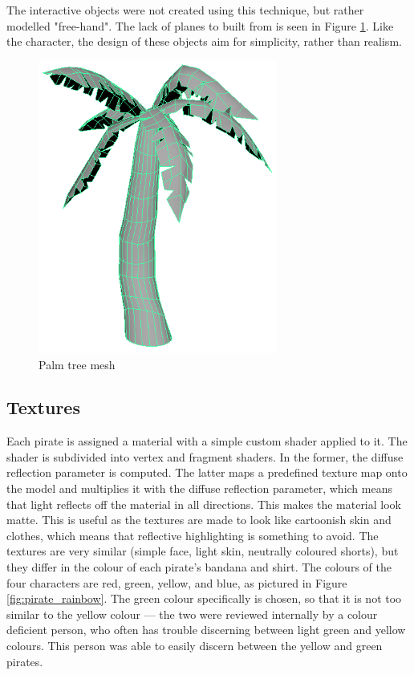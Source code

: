 The interactive objects were not created using this technique, but rather modelled "free-hand". The lack of planes to built from is seen in Figure \ref{fig:palmtree_mesh}. Like the character, the design of these objects aim for simplicity, rather than realism.

\begin{figure}[h!]
	\centering
	\includegraphics[width=0.7\textwidth]{figures/palmtree_mesh.png}
	\caption{Palm tree mesh \label{fig:palmtree_mesh}}
\end{figure}

\subsection{Textures}
Each pirate is assigned a material with a simple custom shader applied to it. The shader is subdivided into vertex and fragment shaders. In the former, the diffuse reflection parameter is computed. The latter maps a predefined texture map onto the model and multiplies it with the diffuse reflection parameter, which means that light reflects off the material in all directions. This makes the material look matte. This is useful as the textures are made to look like cartoonish skin and clothes, which means that reflective highlighting is something to avoid. The textures are very similar (simple face, light skin, neutrally coloured shorts), but they differ in the colour of each pirate's bandana and shirt. The colours of the four characters are red, green, yellow, and blue, as pictured in Figure \ref{fig:pirate_rainbow}. The green colour specifically is chosen, so that it is not too similar to the yellow colour --- the two were reviewed internally by a colour deficient person, who often has trouble discerning between light green and yellow colours. This person was able to easily discern between the yellow and green pirates.


